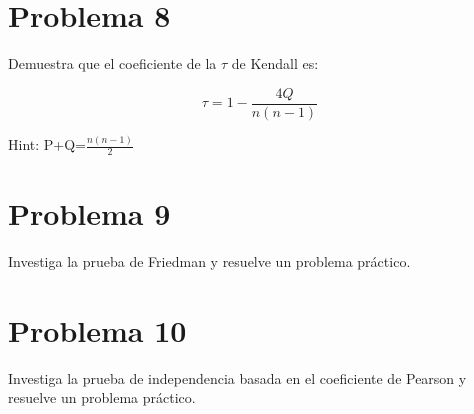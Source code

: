 \documentclass{article}
\begin{document}
\section{Problema 8}

Demuestra que el coeficiente de la $\tau$ de Kendall es:

$$\tau=1-\frac{4Q}{n(n-1)}$$

Hint: P+Q=$\frac{n(n-1)}{2}$

\section{Problema 9}

Investiga la prueba de Friedman y resuelve un problema práctico.

\section{Problema 10}

Investiga la prueba de independencia basada en el coeficiente de Pearson y resuelve un problema práctico.
\end{document}
